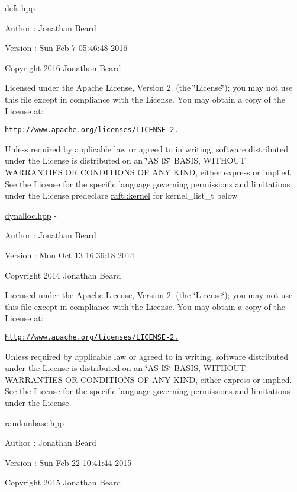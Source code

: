 \hyperlink{defs_8hpp_source}{defs.\+hpp} -\/ \begin{DoxyAuthor}{Author}
\+: Jonathan Beard 
\end{DoxyAuthor}
\begin{DoxyVersion}{Version}
\+: Sun Feb 7 05\+:46\+:48 2016
\end{DoxyVersion}
Copyright 2016 Jonathan Beard

Licensed under the Apache License, Version 2. (the \char`\"{}\+License\char`\"{}); you may not use this file except in compliance with the License. You may obtain a copy of the License at\+:

\href{http://www.apache.org/licenses/LICENSE-2.0}{\tt http\+://www.\+apache.\+org/licenses/\+L\+I\+C\+E\+N\+S\+E-\/2.}

Unless required by applicable law or agreed to in writing, software distributed under the License is distributed on an \char`\"{}\+A\+S I\+S\char`\"{} B\+A\+S\+IS, W\+I\+T\+H\+O\+UT W\+A\+R\+R\+A\+N\+T\+I\+ES OR C\+O\+N\+D\+I\+T\+I\+O\+NS OF A\+NY K\+I\+ND, either express or implied. See the License for the specific language governing permissions and limitations under the License.\+predeclare \hyperlink{classraft_1_1kernel}{raft\+::kernel} for kernel\+\_\+list\+\_\+t below

\hyperlink{dynalloc_8hpp_source}{dynalloc.\+hpp} -\/ \begin{DoxyAuthor}{Author}
\+: Jonathan Beard 
\end{DoxyAuthor}
\begin{DoxyVersion}{Version}
\+: Mon Oct 13 16\+:36\+:18 2014
\end{DoxyVersion}
Copyright 2014 Jonathan Beard

Licensed under the Apache License, Version 2. (the \char`\"{}\+License\char`\"{}); you may not use this file except in compliance with the License. You may obtain a copy of the License at\+:

\href{http://www.apache.org/licenses/LICENSE-2.0}{\tt http\+://www.\+apache.\+org/licenses/\+L\+I\+C\+E\+N\+S\+E-\/2.}

Unless required by applicable law or agreed to in writing, software distributed under the License is distributed on an \char`\"{}\+A\+S I\+S\char`\"{} B\+A\+S\+IS, W\+I\+T\+H\+O\+UT W\+A\+R\+R\+A\+N\+T\+I\+ES OR C\+O\+N\+D\+I\+T\+I\+O\+NS OF A\+NY K\+I\+ND, either express or implied. See the License for the specific language governing permissions and limitations under the License.

\hyperlink{randombase_8hpp_source}{randombase.\+hpp} -\/ \begin{DoxyAuthor}{Author}
\+: Jonathan Beard 
\end{DoxyAuthor}
\begin{DoxyVersion}{Version}
\+: Sun Feb 22 10\+:41\+:44 2015
\end{DoxyVersion}
Copyright 2015 Jonathan Beard


